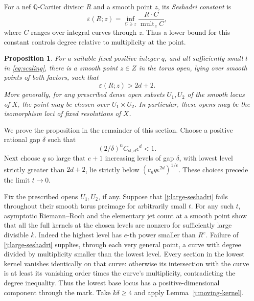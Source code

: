 \documentclass[12pt,a4paper,psamsfonts]{amsart}
\theoremstyle{definition}
\theoremstyle{plain}
\newtheorem{proposition}[lemma]{Proposition}
\newcommand{\mult}{\operatorname{mult}}
\begin{document}
For a nef $\mathbb{Q}$-Cartier divisor $R$ and a smooth point $z$, its
\emph{Seshadri constant} is
\[
 \varepsilon(R;z)=\inf_{C\ni z}\frac{R\cdot C}{\mult_z C},
\]
where $C$ ranges over integral curves through $z$. Thus a lower bound
for this constant controls degree relative to multiplicity at the point.

\begin{proposition}\label{prop:large-seshadri}
For a suitable fixed positive integer $q$, and all sufficiently
small $t$ in \eqref{eq:scaling}, there is a smooth point $z\in Z$
in the torus open, lying over smooth points of both factors, such
that
\begin{equation}\label{j:large-seshadri}
                         \varepsilon(R;z)>2d+2.
\end{equation}
More generally, for any prescribed dense open subsets $U_1,U_2$
of the smooth locus of $X$, the point may be chosen over
$U_1\times U_2$. In particular, these opens may be the
isomorphism loci of fixed resolutions of $X$.
\end{proposition}

We prove the proposition in the remainder of this section. Choose a
positive rational gap $\delta$ such that
\begin{equation}\label{j:slice-gap}
             (2/\delta)^nC_{\mathrm{sl},d}\epsilon^d<1.
\end{equation}
Next choose $q$ so large that $e+1$ increasing levels of gap $\delta$,
with lowest level strictly greater than $2d+2$, lie strictly below
$(c_nq\epsilon^{2d})^{1/e}$. These choices precede the limit
$t\to0$.

Fix the prescribed opens $U_1,U_2$, if any. Suppose that
\eqref{j:large-seshadri} fails throughout their smooth torus
preimage for arbitrarily small $t$. For any such $t$, asymptotic
Riemann--Roch and the elementary
jet count at a smooth point show that all the full kernels at the
chosen levels are nonzero for sufficiently large divisible $k$.
Indeed the highest level has $e$-th power smaller than $R^e$.
Failure of \eqref{j:large-seshadri} supplies, through each very
general point, a curve with degree divided by multiplicity smaller
than the lowest level. Every section in the lowest kernel vanishes
identically on that curve: otherwise its intersection with the
curve is at least its vanishing order times the curve's
multiplicity, contradicting the degree inequality. Thus the lowest
base locus has a positive-dimensional component through the mark.
Take $k\delta\ge4$ and apply Lemma~\ref{j:moving-kernel}.
\end{document}
